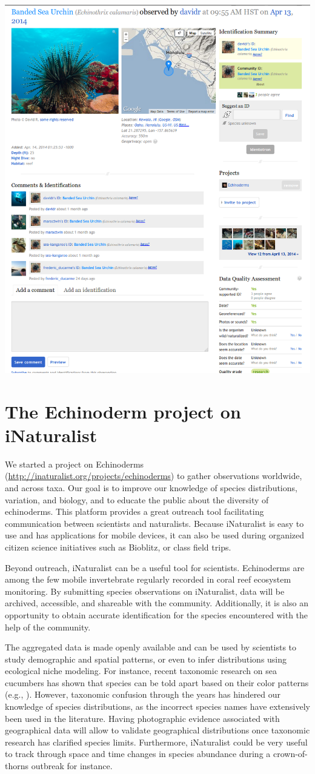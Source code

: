 \documentclass[11pt]{article}\usepackage[]{graphicx}\usepackage[]{color}
\begin{document}
\begin{center}
\includegraphics[width=.5\columnwidth]{images/inat-screenshot}
\label{fig:example-observation}
\end{center}

\section*{The Echinoderm project on iNaturalist}

We started a project on Echinoderms
(\href{http://inaturalist.org/projects/echinoderms}{http://inaturalist.org/projects/echinoderms})
to gather observations worldwide, and across taxa. Our goal is to improve our
knowledge of species distributions, variation, and biology, and to educate the
public about the diversity of echinoderms. This platform provides a great
outreach tool facilitating communication between scientists and
naturalists. Because iNaturalist is easy to use and has applications for mobile
devices, it can also be used during organized citizen science initiatives such
as Bioblitz, or class field trips.

Beyond outreach, iNaturalist can be a useful tool for scientists. Echinoderms
are among the few mobile invertebrate regularly recorded in coral reef ecosystem
monitoring. By submitting species observations on iNaturalist, data will be
archived, accessible, and shareable with the community. Additionally, it is also
an opportunity to obtain accurate identification for the species encountered
with the help of the community.

The aggregated data is made openly available and can be used by scientists to
study demographic and spatial patterns, or even to infer distributions using
ecological niche modeling. For instance, recent taxonomic research on sea
cucumbers has shown that species can be told apart based on their color patterns
(e.g., \citealt{Kim2013,Kerr2013}). However, taxonomic confusion through the
years has hindered our knowledge of species distributions, as the incorrect
species names have extensively been used in the literature. Having photographic
evidence associated with geographical data will allow to validate geographical
distributions once taxonomic research has clarified species limits. Furthermore,
iNaturalist could be very useful to track through space and time changes in
species abundance during a crown-of-thorns outbreak for instance.
\end{document}
